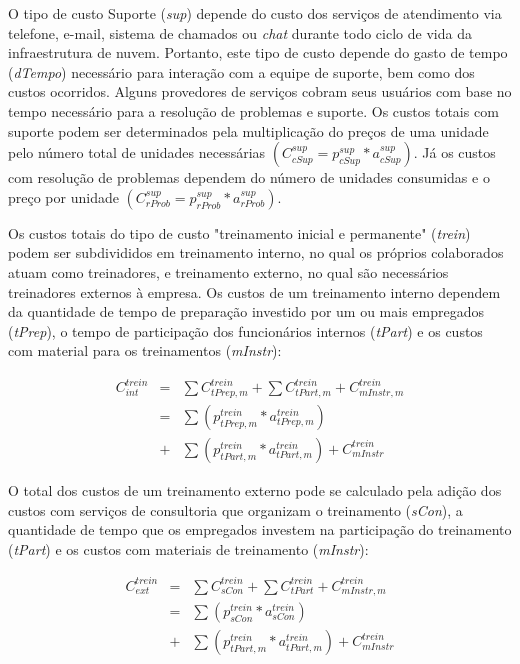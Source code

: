 \documentclass[tese,capa]{texufpel}
\begin{document}
O tipo de custo Suporte (\emph{sup}) depende do custo dos serviços de atendimento via telefone, e-mail, sistema de chamados ou \emph{chat} durante todo ciclo de vida da infraestrutura de nuvem. Portanto, este tipo de custo depende do gasto de tempo (\emph{dTempo}) necessário para interação com a equipe de suporte, bem como dos custos ocorridos. Alguns provedores de serviços cobram seus usuários com base no tempo necessário para a resolução de problemas e suporte. Os custos totais com suporte podem ser determinados pela multiplicação do preços de uma unidade pelo número total de unidades necessárias $\left(C^{sup}_{cSup} = p^{sup}_{cSup} * a^{sup}_{cSup}\right)$. Já os custos com resolução de problemas dependem do número de unidades consumidas e o preço por unidade $\left(C^{sup}_{rProb} = p^{sup}_{rProb} * a^{sup}_{rProb }\right)$.

Os custos totais do tipo de custo "treinamento inicial e permanente" (\emph{trein}) podem ser subdivididos em treinamento interno, no qual os próprios colaborados atuam como treinadores, e treinamento externo, no qual são necessários treinadores externos à empresa. Os custos de um treinamento interno dependem da quantidade de tempo de preparação investido por um ou mais empregados (\emph{tPrep}), o tempo de participação dos funcionários internos (\emph{tPart}) e os custos com material para os treinamentos (\emph{mInstr}):

\begin{eqnarray*}
C^{trein}_{int} &=& \sum C^{trein}_{tPrep,m} + \sum C^{trein}_{tPart,m} + C^{trein}_{mInstr,m} \\
                &=& \sum\left(p^{trein}_{tPrep,m} * a^{trein}_{tPrep,m}\right) \\
                &+& \sum\left(p^{trein}_{tPart,m} * a^{trein}_{tPart,m}\right) + C^{trein}_{mInstr}
\end{eqnarray*}

O total dos custos de um treinamento externo pode se calculado pela adição dos custos com serviços de consultoria que organizam o treinamento (\emph{sCon}), a quantidade de tempo que os empregados investem na participação do treinamento (\emph{tPart}) e os custos com materiais de treinamento (\emph{mInstr}):

\begin{eqnarray*}
C^{trein}_{ext} &=& \sum C^{trein}_{sCon} + \sum C^{trein}_{tPart} + C^{trein}_{mInstr,m} \\
                &=& \sum\left(p^{trein}_{sCon} * a^{trein}_{sCon}\right) \\
                &+& \sum\left(p^{trein}_{tPart,m} * a^{trein}_{tPart,m}\right) + C^{trein}_{mInstr}
\end{eqnarray*}
\end{document}
